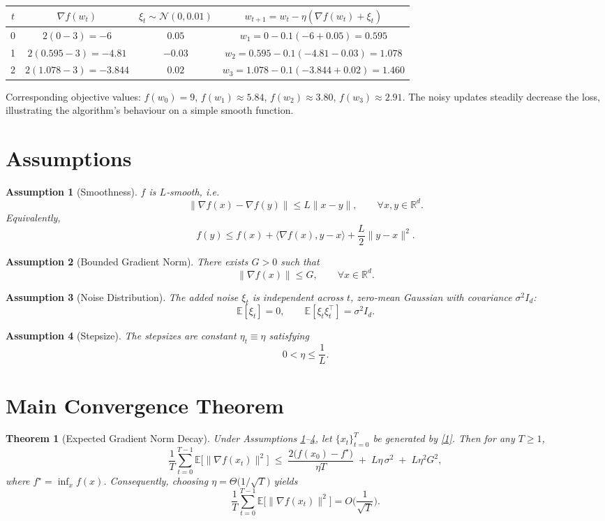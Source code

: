\documentclass{article}
\newtheorem{theorem}{Theorem}
\newtheorem{assumption}{Assumption}
\newcommand{\E}{\mathbb{E}}
\newcommand{\R}{\mathbb{R}}
\begin{document}
\begin{center}
\begin{tabular}{c|c|c|c}
$t$ & $\nabla f(w_{t})$ & $\xi_{t}\sim\mathcal N(0,0.01)$ & $w_{t+1}=w_{t}-\eta(\nabla f(w_{t})+\xi_{t})$ \\ \hline
0 & $2(0-3)=-6$ & $0.05$ & $w_{1}=0-0.1(-6+0.05)=0.595$ \\
1 & $2(0.595-3)=-4.81$ & $-0.03$ & $w_{2}=0.595-0.1(-4.81-0.03)=1.078$ \\
2 & $2(1.078-3)=-3.844$ & $0.02$ & $w_{3}=1.078-0.1(-3.844+0.02)=1.460$ 
\end{tabular}
\end{center}
Corresponding objective values:
$f(w_{0})=9$, $f(w_{1})\approx5.84$, $f(w_{2})\approx3.80$, $f(w_{3})\approx2.91$.
The noisy updates steadily decrease the loss, illustrating the algorithm’s
behaviour on a simple smooth function.

\newpage
\section*{Assumptions}
\begin{assumption}[Smoothness]\label{ass:smooth}
$f$ is $L$‑smooth, i.e.
\[
\|\nabla f(x)-\nabla f(y)\|\le L\|x-y\|,\qquad\forall x,y\in\R^{d}.
\tag{A1}
\]
Equivalently,
\[
f(y)\le f(x)+\langle\nabla f(x),y-x\rangle+\frac{L}{2}\|y-x\|^{2}.
\tag{A1'}
\]
\end{assumption}
\begin{assumption}[Bounded Gradient Norm]\label{ass:bound}
There exists $G>0$ such that
\[
\|\nabla f(x)\|\le G,\qquad\forall x\in\R^{d}.
\tag{A2}
\]
\end{assumption}
\begin{assumption}[Noise Distribution]\label{ass:noise}
The added noise $\xi_{t}$ is independent across $t$, zero‑mean Gaussian with
covariance $\sigma^{2}I_{d}$:
\[
\E[\xi_{t}]=0,\qquad \E[\xi_{t}\xi_{t}^{\top}]=\sigma^{2}I_{d}.
\tag{A3}
\]
\end{assumption}
\begin{assumption}[Stepsize]\label{ass:stepsize}
The stepsizes are constant $\eta_{t}\equiv\eta$ satisfying
\[
0<\eta\le \frac{1}{L}.
\tag{A4}
\]
\end{assumption}

\section*{Main Convergence Theorem}
\begin{theorem}[Expected Gradient Norm Decay]\label{thm:main}
Under Assumptions \ref{ass:smooth}–\ref{ass:stepsize},
let $\{x_{t}\}_{t=0}^{T}$ be generated by \eqref{1}. Then for any $T\ge1$,
\[
\frac{1}{T}\sum_{t=0}^{T-1}\E\big[\|\nabla f(x_{t})\|^{2}\big]
\;\le\;
\frac{2\big(f(x_{0})-f^{\star}\big)}{\eta T}
\;+\;
L\eta\,\sigma^{2}
\;+\;
L\eta^{2}G^{2},
\tag{2}
\]
where $f^{\star}= \inf_{x} f(x)$.
Consequently, choosing $\eta =\Theta\!\big(1/\sqrt{T}\big)$ yields
\[
\frac{1}{T}\sum_{t=0}^{T-1}\E\big[\|\nabla f(x_{t})\|^{2}\big]
=O\!\Big(\frac{1}{\sqrt{T}}\Big).
\]
\end{theorem}
\end{document}

